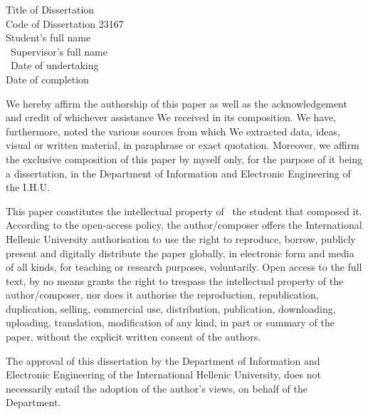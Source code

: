\thispagestyle{empty} %

\vspace{3cm}

\begin{center}
Title of Dissertation \thesisTitleGreek\\
Code of Dissertation 23167\\
Student’s full name \studentName\\\
Supervisor’s full name \supervisorName\\\
Date of undertaking \undertakingDate\\
Date of completion \completionDate\\
\end{center}

We hereby affirm the authorship of this paper as well as the acknowledgement and credit of whichever assistance We received in its composition. We have, furthermore, noted the various sources from which We extracted data, ideas, visual or written material, in paraphrase or exact quotation. Moreover, we affirm the exclusive composition of this paper by myself only, for the purpose of it being a dissertation, in the Department of Information and Electronic Engineering of the I.H.U.

This paper constitutes the intellectual property of \studentName\, the student that composed it. According to the open-access policy, the author/composer offers the International Hellenic University authorisation to use the right to reproduce, borrow, publicly present and digitally distribute the paper globally, in electronic form and media of all kinds, for teaching or research purposes, voluntarily. Open access to the full text, by no means grants the right to trespass the intellectual property of the author/composer, nor does it authorise the reproduction, republication, duplication, selling, commercial use, distribution, publication, downloading, uploading, translation, modification of any kind, in part or summary of the paper, without the explicit written consent of the authors.

The approval of this dissertation by the Department of Information and Electronic Engineering of the International Hellenic University, does not necessarily entail the adoption of the author’s views, on behalf of the Department.